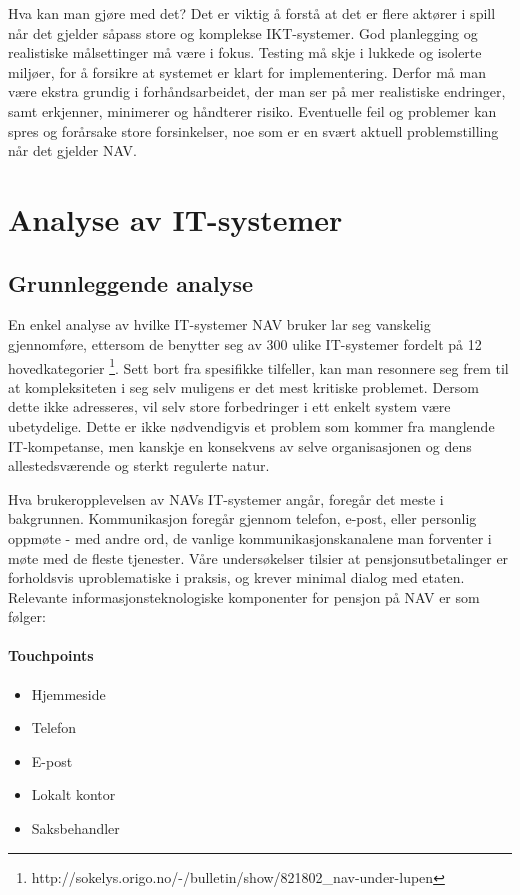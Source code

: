\documentclass[informationsecurity]{gucmasterproject}
\begin{document}
Hva kan man gjøre med det?
Det er viktig å forstå at det er flere aktører i spill når det gjelder såpass store og komplekse IKT-systemer. God planlegging og realistiske målsettinger må være i fokus. Testing må skje i lukkede og isolerte miljøer, for å forsikre at systemet er klart for implementering. 
Derfor må man være ekstra grundig i forhåndsarbeidet, der man ser på mer realistiske endringer, samt erkjenner, minimerer og håndterer risiko. Eventuelle feil og problemer kan spres og forårsake store forsinkelser, noe som er en svært aktuell problemstilling når det gjelder NAV.




\chapter{Analyse av IT-systemer}
\section{Grunnleggende analyse}
En enkel analyse av hvilke IT-systemer NAV bruker lar seg vanskelig gjennomføre, ettersom de benytter seg av 300 ulike IT-systemer fordelt på 12 hovedkategorier \footnote{http://sokelys.origo.no/-/bulletin/show/821802\_nav-under-lupen}. Sett bort fra spesifikke tilfeller, kan man resonnere seg frem til at kompleksiteten i seg selv muligens er det mest kritiske problemet. Dersom dette ikke adresseres, vil selv store forbedringer i ett enkelt system være ubetydelige. Dette er ikke nødvendigvis et problem som kommer fra manglende IT-kompetanse, men kanskje en konsekvens av selve organisasjonen og dens allestedsværende og sterkt regulerte natur.

Hva brukeropplevelsen av NAVs IT-systemer angår, foregår det meste i bakgrunnen. Kommunikasjon foregår gjennom telefon, e-post, eller personlig oppmøte - med andre ord, de vanlige kommunikasjonskanalene man forventer i møte med de fleste tjenester. Våre undersøkelser tilsier at pensjonsutbetalinger er forholdsvis uproblematiske i praksis, og krever minimal dialog med etaten. Relevante informasjonsteknologiske komponenter for pensjon på NAV er som følger:

\subsubsection{Touchpoints}
\begin{itemize}
\item Hjemmeside
\item Telefon
\item E-post
\item Lokalt kontor
\item Saksbehandler
\end{itemize}
\end{document}
